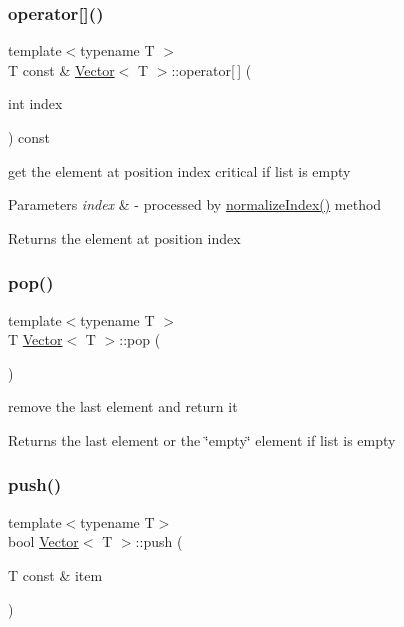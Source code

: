 \subsubsection{\texorpdfstring{operator[]()}{operator[]()}\hspace{0.1cm}{\footnotesize\ttfamily [2/2]}}
{\footnotesize\ttfamily template$<$typename T $>$ \\
T const  \& \hyperlink{classVector}{Vector}$<$ T $>$\+::operator\mbox{[}$\,$\mbox{]} (\begin{DoxyParamCaption}\item[{int}]{index }\end{DoxyParamCaption}) const}

get the element at position index critical if list is empty 
\begin{DoxyParams}{Parameters}
{\em index} & -\/ processed by \hyperlink{classVector_a63f7ddd7328b13bc30b2243b50f70ec9}{normalize\+Index()} method \\
\hline
\end{DoxyParams}
\begin{DoxyReturn}{Returns}
the element at position index 
\end{DoxyReturn}
\mbox{\label{classVector_aef4a3e10a9844ea17cdd89cee17e495a}} 
\subsubsection{\texorpdfstring{pop()}{pop()}}
{\footnotesize\ttfamily template$<$typename T $>$ \\
T \hyperlink{classVector}{Vector}$<$ T $>$\+::pop (\begin{DoxyParamCaption}{ }\end{DoxyParamCaption})}

remove the last element and return it \begin{DoxyReturn}{Returns}
the last element or the \char`\"{}empty\char`\"{} element if list is empty 
\end{DoxyReturn}
\mbox{\label{classVector_ad15116a272b1924dc11e3543a8fc95d8}} 
\subsubsection{\texorpdfstring{push()}{push()}}
{\footnotesize\ttfamily template$<$typename T$>$ \\
bool \hyperlink{classVector}{Vector}$<$ T $>$\+::push (\begin{DoxyParamCaption}\item[{T const \&}]{item }\end{DoxyParamCaption})}

